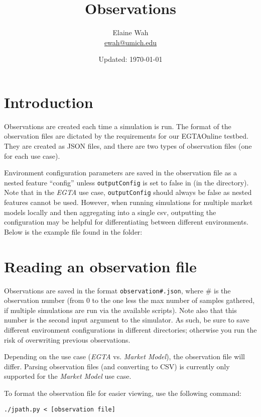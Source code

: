 \documentclass[11pt]{article}
\title{Observations}
\author{
  Elaine Wah\\
  \href{mailto:ewah@umich.edu}{ewah@umich.edu}
}
\date{Updated: \today}
\begin{document}
	
\maketitle

\section{Introduction}

Observations are created each time a simulation is run.
The format of the observation files are dictated by the requirements for our EGTAOnline testbed. They are created as JSON files, and there are two types of observation files (one for each use case).

Environment configuration parameters are saved in the observation file as a nested feature ``config'' unless \verb|outputConfig| is set to false in  (in the  directory).
Note that in the \emph{EGTA} use case, \verb|outputConfig| should always be false as nested features cannot be used. However, when running simulations for multiple market models locally and then aggregating into a single csv, outputting the configuration may be helpful for differentiating between different environments.
%
Below is the example  file found in
the  folder:




\section{Reading an observation file}

Observations are saved in the format \verb|observation#.json|, where \# is the observation number (from 0 to the one less the max number of samples gathered, if multiple simulations are run via the available scripts). Note also that this number is the second input argument to the simulator.
As such, be sure to save different environment configurations in different directories; otherwise you run the risk of overwriting previous observations.

Depending on the use case (\emph{EGTA} vs. \emph{Market Model}), the observation file will differ. Parsing observation files (and converting to CSV) is currently only supported for the \emph{Market Model} use case.

To format the observation file for easier viewing, use the following command:
\begin{verbatim}
./jpath.py < [observation file]
\end{verbatim}
\end{document}
